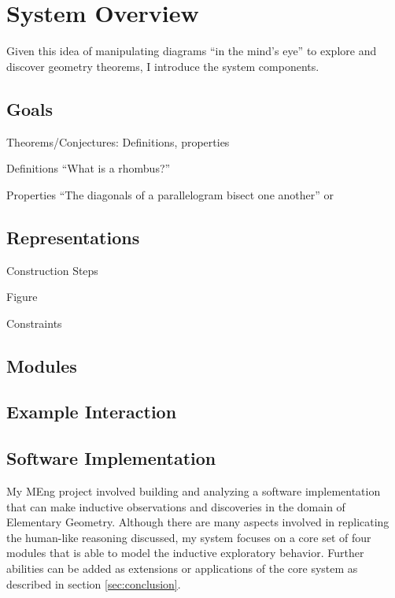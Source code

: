 \chapter{System Overview}
\label{chap:sys-overview}

Given this idea of manipulating diagrams ``in the mind's eye'' to
explore and discover geometry theorems, I introduce the system
components.

\section{Goals}

Theorems/Conjectures: Definitions, properties

Definitions ``What is a rhombus?''

Properties ``The diagonals of a parallelogram bisect one another'' or

\section{Representations}

Construction Steps

Figure

Constraints

\section{Modules}

\section{Example Interaction}




\section{Software Implementation}

My MEng project involved building and analyzing a software
implementation that can make inductive observations and discoveries in
the domain of Elementary Geometry.  Although there are many aspects
involved in replicating the human-like reasoning discussed, my system
focuses on a core set of four modules that is able to model the
inductive exploratory behavior.  Further abilities can be added as
extensions or applications of the core system as described in section
\ref{sec:conclusion}.

